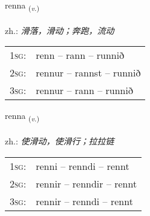 \documentclass[frontgrid, backgrid]{flacards}\usepackage[]{graphicx}\usepackage[]{xcolor}
\begin{document}
\renewcommand{\flhead}{\vskip5pt \fboxsep=0pt {\small\bfseries\footnotesize Sagnorð | 动词}}
\renewcommand{\fcfoot}{\vskip5pt \fboxsep=0pt \hspace{2pt}{\small\bfseries\footnotesize 1K}}

\renewcommand{\blhead}{\vskip5pt {\small\bfseries\footnotesize Sagnorð | 动词 }}
\renewcommand{\bcfoot}{\vskip5pt \hspace{2pt}{\small\bfseries\footnotesize 1K}}


{renna \small{\textsubscript{(\textit{v.})}} \\[1ex] %
\textphonetic{[rɛna]} \\
zh.: \emph{滑落，滑动；奔跑，流动} \\  [2ex]
\renewcommand*{\arraystretch}{0.8}
\begin{tabular}{p{1cm}l}
\textsc{1sg}: & renn -- rann -- runnið \\ 
\textsc{2sg}: & rennur -- rannst -- runnið \\ 
\textsc{3sg}: & rennur -- rann -- runnið \\ 
\end{tabular}
}

\renewcommand{\flhead}{\vskip5pt \fboxsep=0pt {\small\bfseries\footnotesize Sagnorð | 动词}}
\renewcommand{\fcfoot}{\vskip5pt \fboxsep=0pt \hspace{2pt}{\small\bfseries\footnotesize 1K}}

\renewcommand{\blhead}{\vskip5pt {\small\bfseries\footnotesize Sagnorð | 动词 }}
\renewcommand{\bcfoot}{\vskip5pt \hspace{2pt}{\small\bfseries\footnotesize 1K}}


{renna \small{\textsubscript{(\textit{v.})}} \\[1ex] %
\textphonetic{[rɛna]} \\
zh.: \emph{使滑动，使滑行；拉拉链} \\  [2ex]
\renewcommand*{\arraystretch}{0.8}
\begin{tabular}{p{1cm}l}
\textsc{1sg}: & renni -- renndi -- rennt \\ 
\textsc{2sg}: & rennir -- renndir -- rennt \\ 
\textsc{3sg}: & rennir -- renndi -- rennt \\ 
\end{tabular}
}
\end{document}
